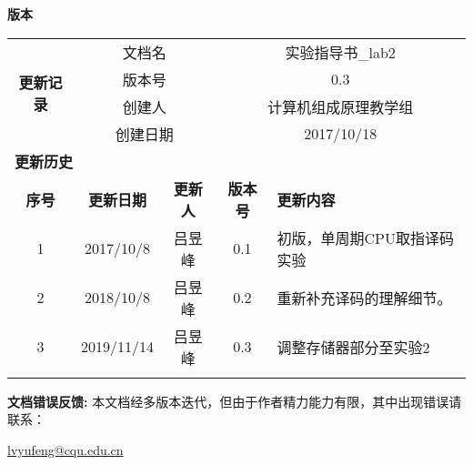 \textbf{版本}

\begin{table}[htbp]
    \centering
    \begin{tabular}{|c|c|c|c|p{6cm}|}
        \hline
        \multirow{4}{*}{\textbf{更新记录}} & \multicolumn{2}{c|}{文档名} & \multicolumn{2}{c|}{实验指导书\_lab2} \\
        \cline{2-5} & \multicolumn{2}{c|}{版本号} & \multicolumn{2}{c|}{0.3} \\
        \cline{2-5} & \multicolumn{2}{c|}{创建人} & \multicolumn{2}{c|}{计算机组成原理教学组} \\
        \cline{2-5} & \multicolumn{2}{c|}{创建日期} & \multicolumn{2}{c|}{2017/10/18} \\
        \hline
        \multicolumn{5}{|l|}{\textbf{更新历史}} \\
        \hline
        \textbf{序号} & \textbf{更新日期} & \textbf{更新人} & \textbf{版本号} & \textbf{更新内容} \\
        \hline 
        1 & 2017/10/8 & 吕昱峰 & 0.1 & 初版，单周期CPU取指译码实验\\
        \hline
        2 & 2018/10/8 & 吕昱峰 & 0.2 & 重新补充译码的理解细节。\\
        \hline
        3 &2019/11/14 & 吕昱峰 & 0.3 & 调整存储器部分至实验2\\
        \hline
         & & & & \\
        \hline
    \end{tabular}
    \label{tab:guide_book_version}
\end{table}





\textbf{文档错误反馈:}
本文档经多版本迭代，但由于作者精力能力有限，其中出现错误请联系：

\url{lvyufeng@cqu.edu.cn}
